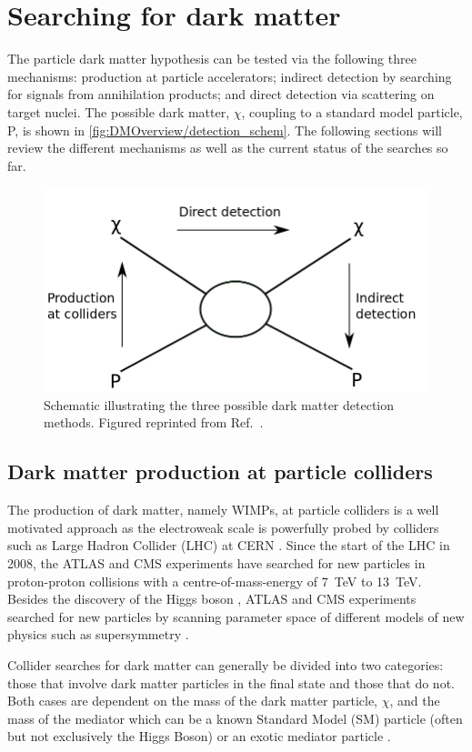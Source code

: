 \section{Searching for dark matter}\label{sec:DMOverview/DetectionOfDM}
The particle dark matter hypothesis can be tested via the following three mechanisms: production at particle accelerators; indirect detection by searching for signals from annihilation products; and direct detection via scattering on target nuclei. The possible dark matter, $\chi$, coupling to a standard model particle, P, is shown in \autoref{fig:DMOverview/detection_schem}. The following sections will review the different mechanisms as well as the current status of the searches so far. 
\begin{figure}[ht!]
	\centering
	\includegraphics[width=0.6\linewidth]{figures/DMOverview/Detection_schematic.png}
	\caption[Schematic illustrating the possible dark matter detection methods.]{Schematic illustrating the three possible dark matter detection methods. Figured reprinted from Ref.~\cite{DirectDetection2015}.}
	\label{fig:DMOverview/detection_schem}
\end{figure}
\subsection{Dark matter production at particle colliders}\label{sec:DMOverview/DMProdColliders}
The production of dark matter, namely WIMPs, at particle colliders is a well motivated approach as the electroweak scale is powerfully probed by colliders such as Large Hadron Collider (LHC) at CERN \cite{Evans:2008zzb}. Since the start of the LHC in 2008, the ATLAS \cite{ATLAS:2008xda} and CMS \cite{CMS:2008xjf} experiments have searched for new particles in proton-proton collisions with a centre-of-mass-energy of 7~TeV to 13~TeV. Besides the discovery of the Higgs boson \cite{ATLAS:2012yve,CMS:2012qbp}, ATLAS and CMS experiments searched for new particles by scanning parameter space of different models of new physics such as supersymmetry \cite{hteagle:thesis}. 

Collider searches for dark matter can generally be divided into two categories: those that involve dark matter particles in the final state and those that do not. Both cases are dependent on the mass of the dark matter particle, $\chi$, and the mass of the mediator which can be a known Standard Model (SM) particle (often but not exclusively the Higgs Boson) or an exotic mediator particle \cite{Penning:2017tmb}. 

